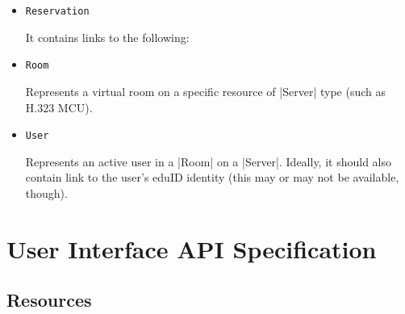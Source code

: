 \documentclass[a4paper]{report}
\newcommand{\APIcmd}[1]{%
\item \lstinline[style=myinline]!#1!%

}
\newenvironment{APIdef}{\begin{itemize}}{\end{itemize}}
\begin{document}
\begin{APIdef}
\APIcmd{Reservation}
It contains links to the following:

\APIcmd{Room}
Represents a virtual room on a specific resource of |Server| type (such as H.323 MCU).

\APIcmd{User}
Represents an active user in a |Room| on a |Server|. Ideally, it should also contain link to the user's eduID identity (this may or may not be available, though).

\end{APIdef}




\chapter{User Interface API Specification}

\section{Resources}
\end{document}
